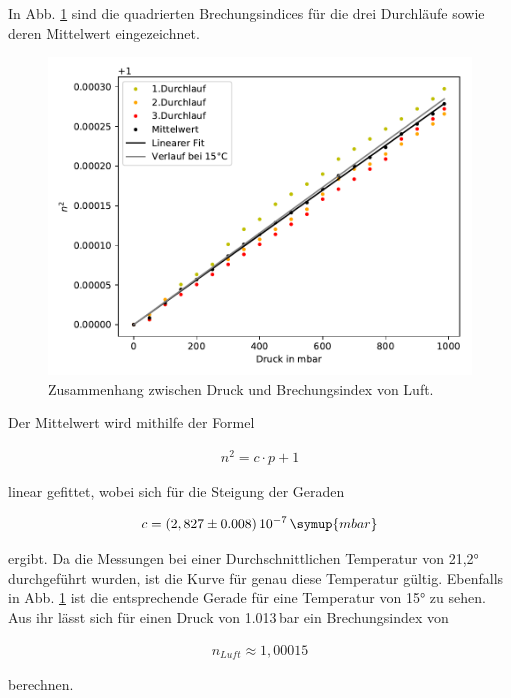            In Abb. \ref{fig:luft} sind die quadrierten Brechungsindices für die drei Durchläufe sowie 
            deren Mittelwert eingezeichnet. 
            
            \begin{figure}
                \centering
                \includegraphics{druck.pdf}
                \caption{Zusammenhang zwischen Druck und Brechungsindex von Luft.}
                \label{fig:luft}
            \end{figure}
            
            Der Mittelwert wird mithilfe der Formel 

            \begin{align*}
                n^2 = c\cdot p + 1
            \end{align*}

            linear gefittet, wobei sich für die Steigung der Geraden

            \begin{align*}
                c = (2,827\pm 0.008)\,10^{-7}\,\symup{mbar}
            \end{align*}

            ergibt. Da die Messungen bei einer Durchschnittlichen Temperatur von 21,2° durchgeführt 
            wurden, ist die Kurve für genau diese Temperatur gültig.
            Ebenfalls in Abb. \ref{fig:luft} ist die entsprechende Gerade für eine Temperatur von 
            15° zu sehen. Aus ihr lässt sich für einen Druck von 1.013\,bar ein Brechungsindex von 

            \begin{align*}
                n_{Luft} \approx 1,00015
            \end{align*}

            berechnen.
